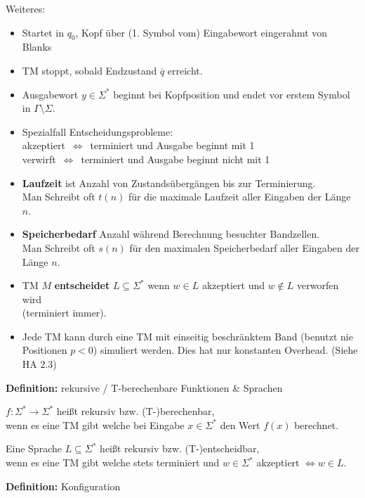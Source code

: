\documentclass[a4paper,graphics,11pt]{article}
\newcommand{\Iff}[0]{\,\Longleftrightarrow\,}
\begin{document}
Weiteres:
\begin{itemize}
    \item Startet in $q_0$, Kopf über (1. Symbol vom) Eingabewort eingerahmt von Blanks
    \item TM stoppt, sobald Endzustand $\overline{q}$ erreicht.
    \item Ausgabewort $y \in \Sigma^*$ beginnt bei Kopfposition und endet vor erstem Symbol in $\Gamma\setminus\Sigma$.
    \\
    \item Spezialfall Entscheidungsprobleme:\\
        akzeptiert $\Iff$ terminiert und Ausgabe beginnt mit 1\\
        verwirft $\Iff$ terminiert und Ausgabe beginnt nicht mit 1
    \item \textbf{Laufzeit} ist Anzahl von Zustandsübergängen bis zur Terminierung.\\
        Man Schreibt oft $t(n)$ für die maximale Laufzeit aller Eingaben der Länge $n$.
    \item \textbf{Speicherbedarf} Anzahl während Berechnung besuchter Bandzellen.\\
        Man Schreibt oft $s(n)$ für den maximalen Speicherbedarf aller Eingaben der Länge $n$.
    \\
    \item TM $M$ \textbf{entscheidet} $L \subseteq \Sigma^*$ wenn $w \in L$ akzeptiert und $w\notin L$ verworfen wird\\
        (terminiert immer).
    \\
    \item Jede TM kann durch eine TM mit einseitig beschränktem Band (benutzt nie Positionen $p<0$) simuliert werden.
        Dies hat nur konstanten Overhead. (Siehe HA 2.3)
\end{itemize}
\strut

\textbf{Definition:} rekursive / T-berechenbare Funktionen \& Sprachen

$f : \Sigma^* \to \Sigma^*$ heißt rekursiv bzw. (T-)berechenbar,\\
wenn es eine TM gibt welche bei Eingabe $x \in \Sigma^*$ den Wert $f(x)$ berechnet.

Eine Sprache $L \subseteq \Sigma^*$ heißt rekursiv bzw. (T-)entscheidbar,\\
wenn es eine TM gibt welche stets terminiert und $w \in \Sigma^*$ akzeptiert $\iff w \in L$.

\strut

\textbf{Definition:} Konfiguration
\end{document}
